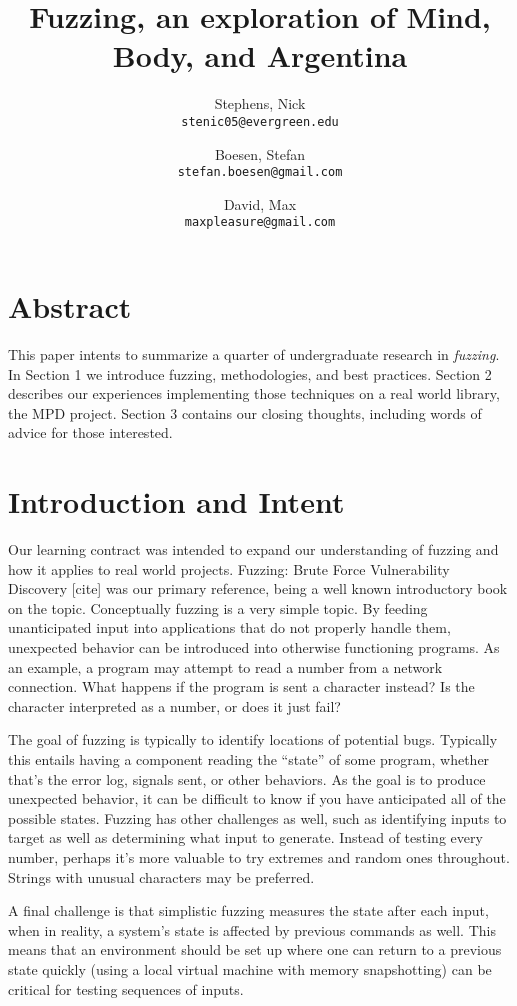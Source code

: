 \documentclass[10pt]{article}
\author{
  Stephens, Nick\\
  \texttt{stenic05@evergreen.edu}
  \and
  Boesen, Stefan\\
  \texttt{stefan.boesen@gmail.com}
  \and
  David, Max\\
  \texttt{maxpleasure@gmail.com}
}
\title{Fuzzing, an exploration of Mind, Body, and Argentina}
\begin{document}
  \maketitle

\section*{Abstract}
This paper intents to summarize a quarter of undergraduate research in \emph{fuzzing}. In Section 1 we introduce fuzzing, methodologies, and best practices. Section 2 describes our experiences implementing those techniques on a real world library, the MPD project. Section 3 contains our closing thoughts, including words of advice for those interested.

\section{Introduction and Intent}
Our learning contract was intended to expand our understanding of fuzzing and how it applies to real world projects. Fuzzing: Brute Force Vulnerability Discovery [cite] was our primary reference, being a well known introductory book on the topic. Conceptually fuzzing is a very simple topic. By feeding unanticipated input into applications that do not properly handle them, unexpected behavior can be introduced into otherwise functioning programs. As an example, a program may attempt to read a number from a network connection. What happens if the program is sent a character instead? Is the character interpreted as a number, or does it just fail? 

The goal of fuzzing is typically to identify locations of potential bugs. Typically this entails having a component reading the ``state'' of some program, whether that's the error log, signals sent, or other behaviors. As the goal is to produce unexpected behavior, it can be difficult to know if you have anticipated all of the possible states. Fuzzing has other challenges as well, such as identifying inputs to target as well as determining what input to generate. Instead of testing every number, perhaps it's more valuable to try extremes and random ones throughout. Strings with unusual characters may be preferred.

A final challenge is that simplistic fuzzing measures the state after each input, when in reality, a system's state is affected by previous commands as well. This means that an environment should be set up where one can return to a previous state quickly (using a local virtual machine with memory snapshotting) can be critical for testing sequences of inputs.
\end{document}
